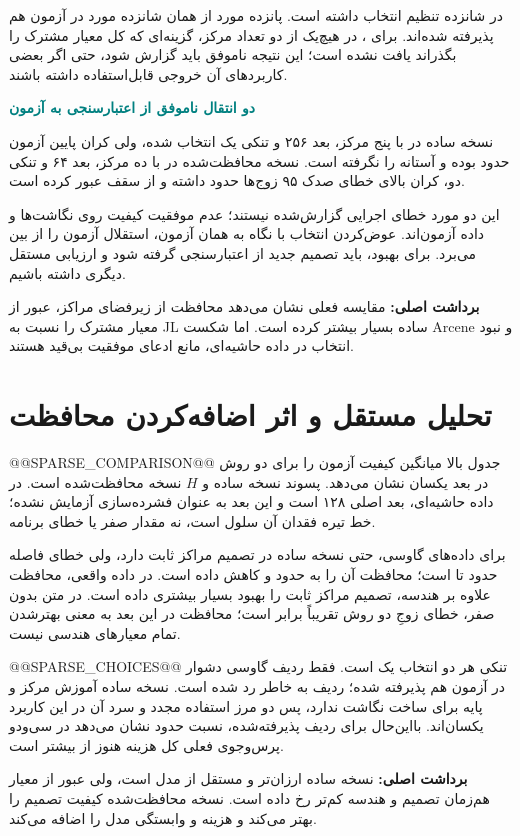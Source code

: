 \documentclass[11pt,a4paper]{article}
\newcommand{\lesson}[1]{\clearpage\section{#1}}
\newcommand{\key}[1]{\par\vspace{4pt}\noindent\colorbox{pale}{\parbox{\dimexpr\textwidth-2\fboxsep\relax}{\textbf{برداشت اصلی:} #1}}\par\vspace{3pt}}
\newcommand{\sub}[1]{\par\vspace{3pt}\textbf{\textcolor{teal}{#1}}\par}
\begin{document}
 در شانزده تنظیم انتخاب داشته است. پانزده مورد از همان شانزده مورد در آزمون هم پذیرفته شده‌اند. برای ، در هیچ‌یک از دو تعداد مرکز، گزینه‌ای که کل معیار مشترک را بگذراند یافت نشده است؛ این نتیجه ناموفق باید گزارش شود، حتی اگر بعضی کاربردهای آن خروجی قابل‌استفاده داشته باشند.

\sub{دو انتقال ناموفق از اعتبارسنجی به آزمون}
نسخه ساده  در  با پنج مرکز، بعد ۲۵۶ و تنکی یک انتخاب شده، ولی کران پایین  آزمون حدود  بوده و آستانه  را نگرفته است. نسخه محافظت‌شده در  با ده مرکز، بعد ۶۴ و تنکی دو، کران بالای خطای صدک ۹۵ زوج‌ها حدود  داشته و از سقف  عبور کرده است.

این دو مورد خطای اجرایی گزارش‌شده نیستند؛ عدم موفقیت کیفیت روی نگاشت‌ها و داده آزمون‌اند. عوض‌کردن انتخاب با نگاه به همان آزمون، استقلال آزمون را از بین می‌برد. برای بهبود، باید تصمیم جدید از اعتبارسنجی گرفته شود و ارزیابی مستقل دیگری داشته باشیم.
\key{مقایسه فعلی نشان می‌دهد محافظت از زیرفضای مراکز، عبور از معیار مشترک را نسبت به JL ساده بسیار بیشتر کرده است. اما شکست Arcene و نبود انتخاب در داده حاشیه‌ای، مانع ادعای موفقیت بی‌قید هستند.}

\lesson{تحلیل مستقل  و اثر اضافه‌کردن محافظت}
@@SPARSE_COMPARISON@@
جدول بالا میانگین کیفیت آزمون را برای دو روش در بعد یکسان نشان می‌دهد. پسوند  نسخه ساده و \(H\) نسخه محافظت‌شده است. در داده حاشیه‌ای، بعد اصلی ۱۲۸ است و این بعد به عنوان فشرده‌سازی آزمایش نشده؛ خط تیره فقدان آن سلول است، نه مقدار صفر یا خطای برنامه.

برای داده‌های گاوسی، حتی نسخه ساده در تصمیم مراکز ثابت  دارد، ولی خطای فاصله حدود  تا  است؛ محافظت آن را به حدود  و  کاهش داده است. در داده واقعی، محافظت علاوه بر هندسه، تصمیم مراکز ثابت را بهبود بسیار بیشتری داده است. در متن بدون صفر، خطای زوجِ دو روش تقریباً برابر است؛ محافظت در این بعد به معنی بهترشدن تمام معیارهای هندسی نیست.

@@SPARSE_CHOICES@@
تنکی هر دو انتخاب یک است. فقط ردیف گاوسی دشوار در آزمون هم پذیرفته شده؛ ردیف  به خاطر  رد شده است. نسخه ساده آموزش مرکز و پایه برای ساخت نگاشت ندارد، پس دو مرز استفاده مجدد و سرد آن در این کاربرد یکسان‌اند. بااین‌حال برای ردیف پذیرفته‌شده، نسبت حدود  نشان می‌دهد در سی‌ودو پرس‌وجوی فعلی کل هزینه هنوز از  بیشتر است.
\key{نسخه ساده ارزان‌تر و مستقل از مدل است، ولی عبور از معیار هم‌زمان تصمیم و هندسه کم‌تر رخ داده است. نسخه محافظت‌شده کیفیت تصمیم را بهتر می‌کند و هزینه و وابستگی مدل را اضافه می‌کند.}
\end{document}
